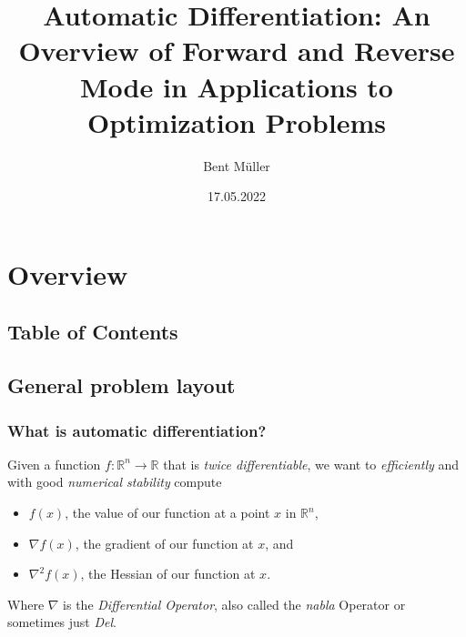 \documentclass{beamer}
\title{
	Automatic Differentiation:
	An Overview of Forward and Reverse Mode
	in Applications to Optimization Problems
}
\author{Bent Müller}
\institute{University of Hamburg}
\date{17.05.2022}
\def\R{{\mathbb R}}
\begin{document}
\begin{frame}
	\titlepage
\end{frame}

\section{Overview}
\subsection{Table of Contents}
\begin{frame}
	\tableofcontents
\end{frame}

\subsection{General problem layout}

\begin{frame}
	\frametitle{What is automatic differentiation?}

	Given a function $f: \R^{n} \longrightarrow \R$ that is
	\textit{twice differentiable}, we want to
	\textit{efficiently}
	and with good \textit{numerical stability} compute
	\vspace{5mm}

	\begin{itemize}
		\item $f(x)$, the value of our function at a point $x$ in $\R^{n}$,
		\item $\nabla f(x)$, the gradient of our function at $x$, and
		\item $\nabla^2 f(x)$, the Hessian of our function at $x$.
	\end{itemize}

	\vspace{5mm}
	Where $\nabla$ is the \textit{Differential Operator}, also called
	the \textit{nabla} Operator or sometimes just \textit{Del}.
\end{frame}
\end{document}

